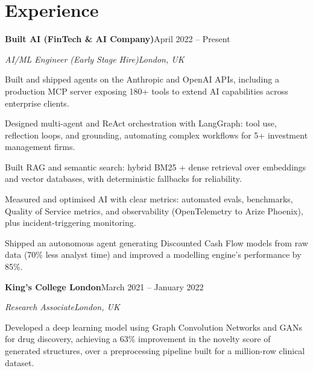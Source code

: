 \documentclass[10pt,a4paper]{article}
\newcommand{\entry}[4]{%
  {\color{company}\bfseries #1}\hfill {\color{muted}#2}\par
  \vspace{1pt}
  {\itshape #3}\hfill {\color{muted}\itshape #4}\par
  \vspace{3pt}%
}
\begin{document}
\section{Experience}
\entry{Built AI (FinTech \& AI Company)}{April 2022 -- Present}{AI/ML Engineer (Early Stage Hire)}{London, UK}
\begin{tight}
  \item Built and shipped agents on the Anthropic and OpenAI APIs, including a production MCP server exposing 180+ tools to extend AI capabilities across enterprise clients.
  \item Designed multi-agent and ReAct orchestration with LangGraph: tool use, reflection loops, and grounding, automating complex workflows for 5+ investment management firms.
  \item Built RAG and semantic search: hybrid BM25 + dense retrieval over embeddings and vector databases, with deterministic fallbacks for reliability.
  \item Measured and optimised AI with clear metrics: automated evals, benchmarks, Quality of Service metrics, and observability (OpenTelemetry to Arize Phoenix), plus incident-triggering monitoring.
  \item Shipped an autonomous agent generating Discounted Cash Flow models from raw data (70\% less analyst time) and improved a modelling engine's performance by 85\%.
\end{tight}

\entry{King's College London}{March 2021 -- January 2022}{Research Associate}{London, UK}
\begin{tight}
  \item Developed a deep learning model using Graph Convolution Networks and GANs for drug discovery, achieving a 63\% improvement in the novelty score of generated structures, over a preprocessing pipeline built for a million-row clinical dataset.
\end{tight}

\end{document}
